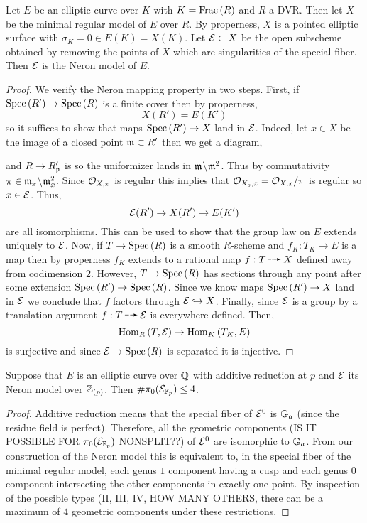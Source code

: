 \documentclass[12pt]{article}
\begin{document}
\begin{prop}
Let $E$ be an elliptic curve over $K$ with $K = \mathrm{Frac}\left(R\right)$ and $R$ a DVR. Then let $X$ be the minimal regular model of $E$ over $R$. By properness, $X$ is a pointed elliptic surface with $\sigma_K = 0 \in E(K) = X(K)$. Let $\mathcal{E} \subset X$ be the open subscheme obtained by removing the points of $X$ which are singularities of the special fiber. Then $\mathcal{E}$ is the Neron model of $E$.
\end{prop}

\begin{proof}
We verify the Neron mapping property in two steps. First, if $\mathrm{Spec}\left( R' \right) \to \mathrm{Spec}\left( R \right)$ is a finite \etale cover then by properness,
\[ X(R') = E(K') \]
so it suffices to show that maps $\mathrm{Spec}\left( R' \right) \to X$ land in $\mathcal{E}$. Indeed, let $x \in X$ be the image of a closed point $\mathfrak{m} \subset R'$ then we get a diagram,
\begin{center}
\end{center} 
and $R \to R'_{\mathfrak{p}}$ is \etale so the uniformizer lands in $\mathfrak{m} \! \setminus \! \mathfrak{m}^2$. Thus by commutativity $\pi \in \mathfrak{m}_x \! \setminus \! \mathfrak{m}_x^2$. Since $\mathcal{O}_{X, x}$ is regular this implies that $\mathcal{O}_{X_s, x} = \mathcal{O}_{X, x} / \pi$ is regular so $x \in \mathcal{E}$. Thus,
\[ \mathcal{E}(R') \to X(R') \to E(K') \]
are all isomorphisms. This can be used to show that the group law on $E$ extends uniquely to $\mathcal{E}$. Now, if $T \to \mathrm{Spec}\left( R \right)$ is a smooth $R$-scheme and $f_K : T_K \to E$ is a map then by properness $f_K$ extends to a rational map $f : T \rat X$ defined away from codimension $2$. However, $T \to \mathrm{Spec}\left( R \right)$ has sections through any point after some \etale extension $\mathrm{Spec}\left( R' \right) \to \mathrm{Spec}\left( R \right)$. Since we know maps $\mathrm{Spec}\left( R' \right) \to X$ land in $\mathcal{E}$ we conclude that $f$ factors through $\mathcal{E} \hookrightarrow X$. Finally, since $\mathcal{E}$ is a group by a translation argument $f : T \rat \E$ is everywhere defined. Then,
\[ \mathrm{Hom}_{R} \left( T, \mathcal{E} \right) \to \mathrm{Hom}_{K} \left( T_K, E \right) \]
is surjective and since $\mathcal{E} \to \mathrm{Spec}\left( R \right)$ is separated it is injective.
\end{proof}


\begin{lemma}
Suppose that $E$ is an elliptic curve over $\mathbb{Q}$ with additive reduction at $p$ and $\mathcal{E}$ its Neron model over $\mathbb{Z}_{(p)}$. Then $\# \pi_0(\mathcal{E}_{\mathbb{F}_p}) \le 4$.
\end{lemma}

\begin{proof}
Additive reduction means that the special fiber of $\mathcal{E}^0$ is ${\mathbb{G}_a}$ (since the residue field is perfect). Therefore, all the geometric components (IS IT POSSIBLE FOR $\pi_0(\mathcal{E}_{\mathbb{F}_p})$ NONSPLIT??) of $\mathcal{E}^0$ are isomorphic to ${\mathbb{G}_a}$. From our construction of the Neron model this is equivalent to, in the special fiber of the minimal regular model, each genus $1$ component having a cusp and each genus $0$ component intersecting the other components in exactly one point. By inspection of the possible types (II, III, IV, HOW MANY OTHERS, there can be a maximum of $4$ geometric components under these restrictions. 
\end{proof}
\end{document}
